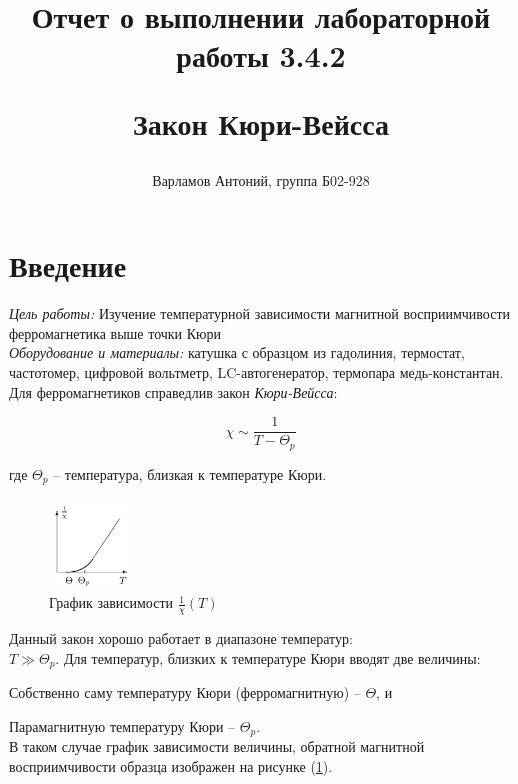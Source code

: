 \documentclass[10pt,a4paper]{article}
\title{
Отчет о выполнении лабораторной работы 3.4.2

Закон Кюри-Вейсса
}
\author{Варламов Антоний, группа Б02-928}
\begin{document}
\maketitle

\newpage

	\section{Введение}
	
	\textit{Цель работы:} Изучение температурной зависимости магнитной восприимчивости ферромагнетика выше точки Кюри\\
	
	\textit{Оборудование и материалы:} катушка с образцом из гадолиния, термостат, частотомер, цифровой вольтметр, LC-автогенератор, термопара медь-константан. \\
	
	Для ферромагнетиков справедлив закон \textit{Кюри-Вейсса}:
	
	\begin{equation}
		\chi \sim \frac{1}{T - \Theta_{p}}
	\end{equation}
	
	где $\Theta_{p}$ -- температура, близкая к температуре Кюри.\\
	
	\begin{figure}
		\vspace{-1.5cm}
		\centering
		\includegraphics[width = 0.2\textwidth]{graph_return_chi_for_temp}
		\caption{График зависимости $\frac{1}{\chi}\left(T\right)$}
		\label{fig:graph_return_chi_for_temp}
	\end{figure}
	
	Данный закон хорошо работает в диапазоне температур:\\ $T \gg \Theta_{p}$. Для температур, близких к температуре Кюри вводят две величины:
	
	Собственно саму температуру Кюри (ферромагнитную) -- $\Theta$, и 
	
	Парамагнитную температуру Кюри -- $\Theta_{p}$.\\ В таком случае график зависимости величины, обратной магнитной восприимчивости образца изображен на рисунке (\ref{fig:graph_return_chi_for_temp}).
	
\end{document}
